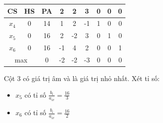 \documentclass[12pt]{article}
\begin{document}
\begin{table}[H]
\centering
\begin{tabular}{|c|c|c|c|c|c|c|c|c|}
\hline
CS & HS & PA & 2 & 2 & 3 & 0 & 0 & 0 \\
\hline
$x_4$ & 0 & 14 & 1 & 2 & -1 & 1 & 0 & 0 \\
$x_5$ & 0 & 16 & 2 & -2 & 3 & 0 & 1 & 0 \\
$x_6$ & 0 & 16 & -1 & 4 & 2 & 0 & 0 & 1 \\
\hline
\multicolumn{2}{|c|}{max}
& 0 & -2 & -2 & -3 & 0 & 0 & 0 \\
\hline
\end{tabular}
\end{table}

\noindent Cột 3 có giá trị âm và là giá trị nhỏ nhất. Xét tỉ số:
\begin{itemize}
\item $x_5$ có tỉ số $\displaystyle \frac{b_i}{a_{iv}} = \frac{16}{3}$
\item $x_6$ có tỉ số $\displaystyle \frac{b_i}{a_{iv}} = \frac{16}{2}$
\end{itemize}
\end{document}

